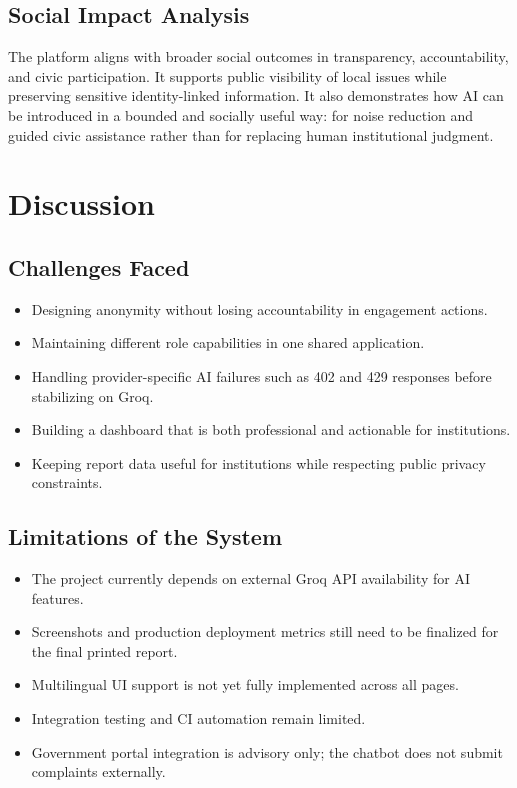 \documentclass[12pt,a4paper]{report}
\begin{document}
\section{Social Impact Analysis}
The platform aligns with broader social outcomes in transparency, accountability, and civic participation. It supports public visibility of local issues while preserving sensitive identity-linked information. It also demonstrates how AI can be introduced in a bounded and socially useful way: for noise reduction and guided civic assistance rather than for replacing human institutional judgment.

\chapter{Discussion}
\section{Challenges Faced}
\begin{itemize}
  \item Designing anonymity without losing accountability in engagement actions.
  \item Maintaining different role capabilities in one shared application.
  \item Handling provider-specific AI failures such as 402 and 429 responses before stabilizing on Groq.
  \item Building a dashboard that is both professional and actionable for institutions.
  \item Keeping report data useful for institutions while respecting public privacy constraints.
\end{itemize}

\section{Limitations of the System}
\begin{itemize}
  \item The project currently depends on external Groq API availability for AI features.
  \item Screenshots and production deployment metrics still need to be finalized for the final printed report.
  \item Multilingual UI support is not yet fully implemented across all pages.
  \item Integration testing and CI automation remain limited.
  \item Government portal integration is advisory only; the chatbot does not submit complaints externally.
\end{itemize}
\end{document}
